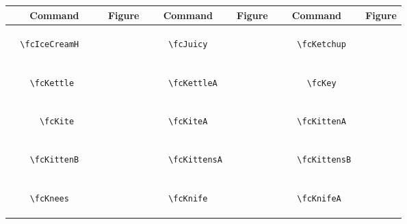 \documentclass[x11names]{article}
\begin{document}
\begin{table}[H]\centering\begin{tabular}{|c|c|c|c|c|c|}\hline{\bf Command} & {\bf Figure} & {\bf Command} & {\bf Figure} & {\bf Command} & {\bf Figure}\\	\hline	&\multirow{5}{*}{	\fcIceCreamH	[scale=0.4]} & &\multirow{5}{*}{	\fcJuicy	[scale=0.4]} & &\multirow{5}{*}{	\fcKetchup	[scale=0.4]}\\	& & & & & \\	& & & & & \\	\verb|	\fcIceCreamH	| & & \verb|	\fcJuicy	| & & \verb|	\fcKetchup	| & \\	& & & & & \\	& & & & & \\	& & & & & \\	\hline									
		&\multirow{5}{*}{	\fcKettle	[scale=0.4]} & &\multirow{5}{*}{	\fcKettleA	[scale=0.4]} & &\multirow{5}{*}{	\fcKey	[scale=0.4]}\\	& & & & & \\	& & & & & \\	\verb|	\fcKettle	| & & \verb|	\fcKettleA	| & & \verb|	\fcKey	| & \\	& & & & & \\	& & & & & \\	& & & & & \\	\hline									
		&\multirow{5}{*}{	\fcKite	[scale=0.8]} & &\multirow{5}{*}{	\fcKiteA	[scale=0.4]} & &\multirow{5}{*}{	\fcKittenA	[scale=0.4]}\\	& & & & & \\	& & & & & \\	\verb|	\fcKite	| & & \verb|	\fcKiteA	| & & \verb|	\fcKittenA	| & \\	& & & & & \\	& & & & & \\	& & & & & \\	\hline									
		&\multirow{5}{*}{	\fcKittenB	[scale=0.4]} & &\multirow{5}{*}{	\fcKittensA	[scale=0.4]} & &\multirow{5}{*}{	\fcKittensB	[scale=0.4]}\\	& & & & & \\	& & & & & \\	\verb|	\fcKittenB	| & & \verb|	\fcKittensA	| & & \verb|	\fcKittensB	| & \\	& & & & & \\	& & & & & \\	& & & & & \\	\hline									
		&\multirow{5}{*}{	\fcKnees	[scale=0.4]} & &\multirow{5}{*}{	\fcKnife	[scale=0.4]} & &\multirow{5}{*}{	\fcKnifeA	[scale=0.4]}\\	& & & & & \\	& & & & & \\	\verb|	\fcKnees	| & & \verb|	\fcKnife	| & & \verb|	\fcKnifeA	| & \\	& & & & & \\	& & & & & \\	& & & & & \\	\hline									

\end{tabular}
\end{table}
\end{document}
